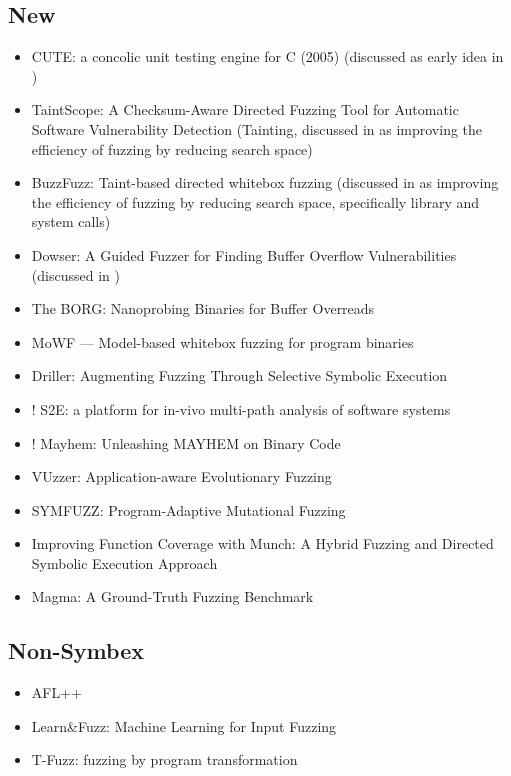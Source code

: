 \documentclass{article}
\begin{document}
\subsection{New}
\begin{itemize}
    \item CUTE: a concolic unit testing engine for C (2005)\cite{CUTE} (discussed as early idea in \cite{Science})
    \item TaintScope: A Checksum-Aware Directed Fuzzing Tool for Automatic Software Vulnerability Detection\cite{TaintScope} (Tainting, discussed in \cite{Science} as improving the efficiency of fuzzing by reducing search space)
    \item BuzzFuzz: Taint-based directed whitebox fuzzing\cite{BuzzFuzz} (discussed in \cite{Science} as improving the efficiency of fuzzing by reducing search space, specifically library and system calls)
    \item Dowser: A Guided Fuzzer for Finding Buffer Overflow Vulnerabilities\cite{Dowser,DowserArticle} (discussed in \cite{Science})
    \item The BORG: Nanoprobing Binaries for Buffer Overreads\cite{BORG}
    \item MoWF — Model-based whitebox fuzzing for program binaries\cite{MoWF}
    \item Driller: Augmenting Fuzzing Through Selective Symbolic Execution\cite{Driller}
    \item ! S2E: a platform for in-vivo multi-path analysis of software systems\cite{S2E}
    \item ! Mayhem: Unleashing MAYHEM on Binary Code\cite{Mayhem}
    \item VUzzer: Application-aware Evolutionary Fuzzing\cite{VUzzer}
    \item SYMFUZZ: Program-Adaptive Mutational Fuzzing\cite{SYMFUZZ}
    \item Improving Function Coverage with Munch: A Hybrid Fuzzing and Directed Symbolic Execution Approach\cite{Munch}
    \item Magma: A Ground-Truth Fuzzing Benchmark\cite{Magma}
\end{itemize}

\subsection{Non-Symbex}
\begin{itemize}
    \item AFL++\cite{AFLPlusPlus}
    \item Learn\&Fuzz: Machine Learning for Input Fuzzing\cite{LearnFuzz}
    \item T-Fuzz: fuzzing by program transformation\cite{TFuzz}
\end{itemize}

\pagebreak


\end{document}
